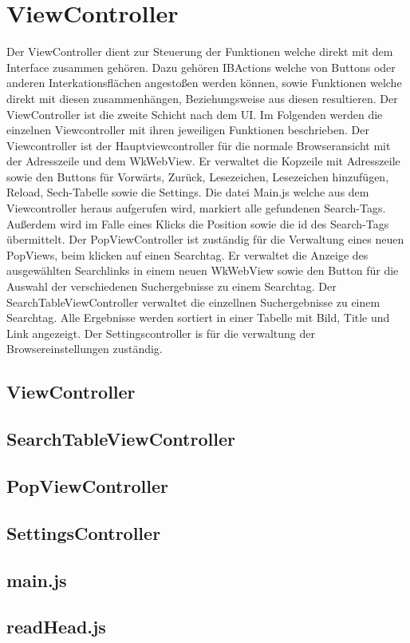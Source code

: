 
\section{ViewController}
Der ViewController dient zur Steuerung der Funktionen welche direkt mit dem Interface zusammen gehören. Dazu gehören
IBActions welche von Buttons oder anderen Interkationsflächen angestoßen werden können, sowie Funktionen welche direkt mit diesen zusammenhängen, Beziehungsweise aus diesen resultieren. Der ViewController ist die zweite Schicht nach dem UI. Im
Folgenden werden die einzelnen Viewcontroller mit ihren jeweiligen Funktionen beschrieben.
Der Viewcontroller ist der Hauptviewcontroller für die normale Browseransicht mit der Adresszeile und dem WkWebView. Er verwaltet die Kopzeile mit Adresszeile sowie den Buttons für Vorwärts, Zurück, Lesezeichen, Lesezeichen hinzufügen, Reload, Sech-Tabelle sowie die Settings. Die datei Main.js welche aus dem Viewcontroller heraus aufgerufen wird, markiert alle gefundenen Search-Tags. Außerdem wird im Falle eines Klicks die Position sowie die id des Search-Tags übermittelt.
Der PopViewController ist zuständig für die Verwaltung eines neuen PopViews, beim klicken auf einen Searchtag. Er verwaltet die Anzeige des ausgewählten Searchlinks in einem neuen WkWebView sowie den Button für die Auswahl der verschiedenen Suchergebnisse zu einem Searchtag.
Der SearchTableViewController verwaltet die einzellnen Suchergebnisse zu einem Searchtag. Alle Ergebnisse werden sortiert in einer Tabelle mit Bild, Title und Link angezeigt.
Der Settingscontroller is für die verwaltung der Browsereinstellungen zuständig.
\subsection{ViewController}
\subsection{SearchTableViewController}
\subsection{PopViewController}
\subsection{SettingsController}
\subsection{main.js}
\subsection{readHead.js}

